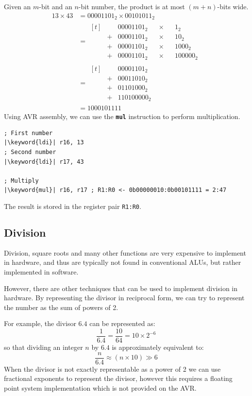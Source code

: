 \documentclass[a4paper]{report}
\newcommand{\keyword}[1]{\textcolor[rgb]{0.00,0.50,0.00}{\textbf{#1}}}
\newcommand{\keywordinline}[1]{\textcolor[rgb]{0.00,0.50,0.00}{\textbf{\texttt{#1}}}}
\begin{document}
Given an \(m\)-bit and an \(n\)-bit number, the product is at most \((m+n)\)-bits wide.
\begin{align*}
    13 \times 43 & = 00001101_2 \times 00101011_2                \\
                 & = \begin{aligned}[t]
                          &   & 00001101_2 &  & \times &  & 1_2      \\
                          & + & 00001101_2 &  & \times &  & 10_2     \\
                          & + & 00001101_2 &  & \times &  & 1000_2   \\
                          & + & 00001101_2 &  & \times &  & 100000_2
                     \end{aligned} \\
                 & = \begin{aligned}[t]
                          &   & 00001101_2  \\
                          & + & 00011010_2  \\
                          & + & 01101000_2  \\
                          & + & 110100000_2
                     \end{aligned}                          \\
                 & = 1000101111
\end{align*}
Using AVR assembly, we can use the \keywordinline{mul} instruction to perform multiplication.
\begin{verbatim}
; First number
|\keyword{ldi}| r16, 13
; Second number
|\keyword{ldi}| r17, 43

; Multiply
|\keyword{mul}| r16, r17 ; R1:R0 <- 0b00000010:0b00101111 = 2:47
\end{verbatim}
The result is stored in the register pair \texttt{R1:R0}.
\subsection{Division}
Division, square roots and many other functions are very expensive to implement in hardware,
and thus are typically not found in conventional ALUs, but rather
implemented in software.

However, there are other techniques that can be used to implement division in hardware.
By representing the divisor in reciprocal form, we can try to represent the number as
the sum of powers of 2.

For example, the divisor \(6.4\) can be represented as:
\begin{equation*}
    \frac{1}{6.4} = \frac{10}{64} = 10 \times 2^{-6}
\end{equation*}
so that dividing an integer \(n\) by \(6.4\) is approximately equivalent to:
\begin{equation*}
    \frac{n}{6.4} \approx \left( n \times 10 \right) \gg 6
\end{equation*}
When the divisor is not exactly representable as a power of 2 we can use fractional
exponents to represent the divisor, however this requires a floating point
system implementation which is not provided on the AVR\@.
\end{document}

